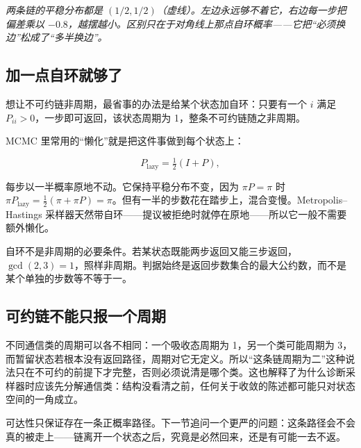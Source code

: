 \begin{center}
\emph{两条链的平稳分布都是 \((1/2,1/2)\)（虚线）。左边永远够不着它，右边每一步把偏差乘以 \(-0.8\)，越摆越小。区别只在于对角线上那点自环概率——它把``必须换边''松成了``多半换边''。}
\end{center}

\subsection{加一点自环就够了}

想让不可约链非周期，最省事的办法是给某个状态加自环：只要有一个 \(i\) 满足 \(P_{ii}>0\)，一步即可返回，该状态周期为 1，整条不可约链随之非周期。

MCMC 里常用的``懒化''就是把这件事做到每个状态上：

\[
P_{\text{lazy}}=\tfrac12(I+P),
\]

每步以一半概率原地不动。它保持平稳分布不变，因为 \(\pi P=\pi\) 时 \(\pi P_{\text{lazy}}=\tfrac12(\pi+\pi P)=\pi\)。但有一半的步数花在踏步上，混合变慢。Metropolis--Hastings 采样器天然带自环——提议被拒绝时就停在原地——所以它一般不需要额外懒化。

自环不是非周期的必要条件。若某状态既能两步返回又能三步返回，\(\gcd(2,3)=1\)，照样非周期。判据始终是返回步数集合的最大公约数，而不是某个单独的步数等不等于一。

\subsection{可约链不能只报一个周期}

不同通信类的周期可以各不相同：一个吸收态周期为 1，另一个类可能周期为 3，而暂留状态若根本没有返回路径，周期对它无定义。所以``这条链周期为二''这种说法只在不可约的前提下才完整，否则必须说清是哪个类。这也解释了为什么诊断采样器时应该先分解通信类：结构没看清之前，任何关于收敛的陈述都可能只对状态空间的一角成立。

可达性只保证存在一条正概率路径。下一节追问一个更严的问题：这条路径会不会真的被走上——链离开一个状态之后，究竟是必然回来，还是有可能一去不返。
